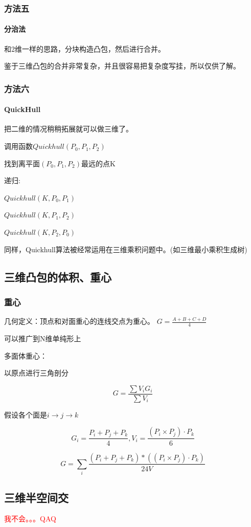 \begin{frame}
\frametitle{方法五}
\framesubtitle{分治法}
\pause
和2维一样的思路，分块构造凸包，然后进行合并。 \newline \newline

\pause
鉴于三维凸包的合并非常复杂，并且很容易把复杂度写挂，所以仅供了解。
\end{frame}

\begin{frame}
\frametitle{方法六}
\framesubtitle{QuickHull}
\pause
把二维的情况稍稍拓展就可以做三维了。

调用函数$Quickhull(P_0,P_1,P_2)$

找到离平面$(P_0,P_1,P_2)$最远的点K

递归:

$Quickhull(K,P_0,P_1)$

$Quickhull(K,P_1,P_2)$

$Quickhull(K,P_2,P_0)$ \newline \newline

\pause
同样，Quickhull算法被经常运用在三维乘积问题中。(如三维最小乘积生成树)
\end{frame}

\subsection{三维凸包的体积、重心}
\begin{frame}
\frametitle{重心}
\pause
几何定义：顶点和对面重心的连线交点为重心。
$G=\frac{A+B+C+D}{4}$

\pause
可以推广到N维单纯形上

\pause
多面体重心：

以原点进行三角剖分

\begin{displaymath}
G=\frac{\sum V_iG_i}{\sum V_i}
\end{displaymath}

假设各个面是$i \rightarrow j \rightarrow k$

\begin{displaymath}
G_i=\frac{P_i+P_j+P_k}{4},V_i=\frac{(P_i \times P_j) \cdot P_k}{6}
\end{displaymath}

\begin{displaymath}
G= \sum_i \frac{(P_i+P_j+P_k)*((P_i \times P_j) \cdot P_k)}{24V}
\end{displaymath}
\end{frame}

\subsection{三维半空间交}
\begin{frame}
\textcolor{red}{\huge{我不会。。。QAQ}}
\end{frame}
